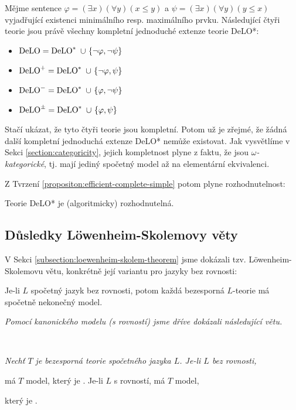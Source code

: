 \begin{proposition}
Mějme sentence $\varphi=(\exists x)(\forall y)(x\leq y)$ a $\psi=(\exists x)(\forall y)(y\leq x)$ vyjadřující existenci minimálního resp. maximálního prvku. Následující čtyři teorie jsou právě všechny kompletní jednoduché extenze teorie DeLO*:
\begin{itemize}
    \item $\operatorname{DeLO} = \operatorname{DeLO}^*\ \cup \ \{\neg\varphi
    ,\neg\psi\}$
    \item $\DeLO^+ = \DeLO^*\ \cup \ \{\neg\varphi
    ,\psi\}$
    \item $\operatorname{DeLO}^- = \operatorname{DeLO}^*\ \cup \ \{\varphi
    ,\neg\psi\}$
    \item $\operatorname{DeLO}^\pm = \operatorname{DeLO}^*\ \cup \ \{\varphi
    ,\psi\}$        
\end{itemize}
\end{proposition}

Stačí ukázat, že tyto čtyři teorie jsou kompletní. Potom už je zřejmé, že žádná další kompletní jednoduchá extenze DeLO* nemůže existovat. Jak vysvětlíme v Sekci \ref{section:categoricity}, jejich kompletnost plyne z faktu, že jsou \emph{$\omega$-kategorické}, tj. mají jediný spočetný model až na elementární ekvivalenci. 

Z Tvrzení \ref{propositon:efficient-complete-simple} potom plyne rozhodnutelnost:

\begin{corollary}
    Teorie DeLO* je (algoritmicky) rozhodnutelná.
\end{corollary}


\subsection{Důsledky Löwenheim-Skolemovy věty}\todo

V Sekci \ref{subsection:loewenheim-skolem-theorem} jsme dokázali tzv. Löwenheim-Skolemovu větu, konkrétně její variantu pro jazyky bez rovnosti:

\begin{theorem-unnumbered}
    Je-li $L$ spočetný jazyk bez rovnosti, potom každá bezesporná $L$-teorie má spočetně nekonečný model.
\end{theorem-unnumbered}




{\it Pomocí kanonického modelu (s rovností) jsme dříve dokázali následující větu.}
\medskip

{\bf {}}\ \ {\it Nechť $T$ je bezesporná teorie spočetného jazyka $L$. Je-li $L$ bez rovnosti,
\smallskip

má $T$ model, který je . Je-li $L$ s rovností, má $T$ model,
\smallskip

který je .}
\bigskip

